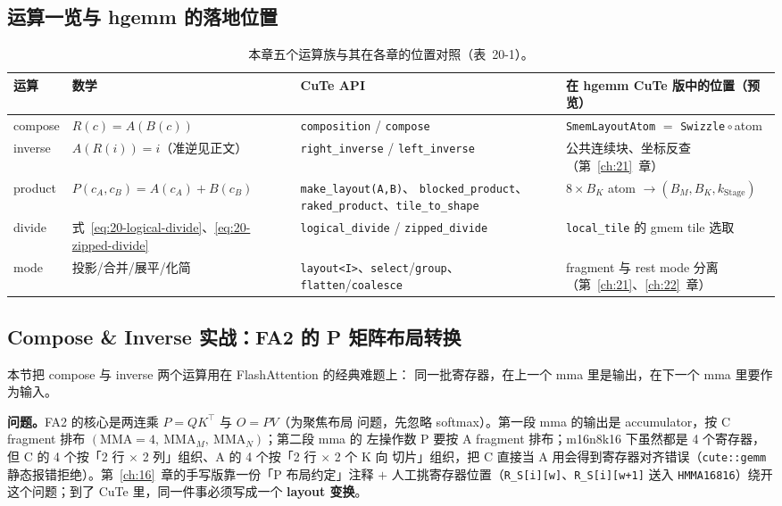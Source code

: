 \subsection{运算一览与 hgemm 的落地位置}

\begin{table}[htbp]
\centering
\footnotesize
\begin{tabular}{@{}p{1.3cm}p{3.2cm}p{3.7cm}p{4.3cm}@{}}
  \hline
  运算 & 数学 & CuTe API & 在 hgemm CuTe 版中的位置（预览） \\
  \hline
  compose & $R(c)=A(B(c))$ & \texttt{composition} / \texttt{compose}
    & \texttt{Smem\allowbreak{}Layout\allowbreak{}Atom} $=$ \texttt{Swizzle}\,$\circ$\,atom \\
  inverse & $A(R(i))=i$（准逆见正文） & \texttt{right\_\allowbreak{}inverse} / \texttt{left\_\allowbreak{}inverse}
    & 公共连续块、坐标反查（第~\ref{ch:21}~章） \\
  product & $P(c_A,c_B)=A(c_A)+B(c_B)$ & \texttt{make\_\allowbreak{}layout\allowbreak{}(A,\allowbreak{}B)}、
    \texttt{blocked\_\allowbreak{}product}、\texttt{raked\_\allowbreak{}product}、\texttt{tile\_\allowbreak{}to\_\allowbreak{}shape}
    & $8\times B_K$ atom $\to(B_M,B_K,k_{\mathrm{Stage}})$ \\
  divide & 式~\eqref{eq:20-logical-divide}、\eqref{eq:20-zipped-divide}
    & \texttt{logical\_\allowbreak{}divide} / \texttt{zipped\_\allowbreak{}divide}
    & \texttt{local\_tile} 的 gmem tile 选取 \\
  mode & 投影/合并/展平/化简 & \texttt{layout<I>}、\texttt{select}/\texttt{group}、
    \texttt{flatten}/\texttt{coalesce}
    & fragment 与 rest mode 分离（第~\ref{ch:21}、\ref{ch:22}~章） \\
  \hline
\end{tabular}
\caption{本章五个运算族与其在各章的位置对照（表~20-1）。}\label{tab:20-1}
\end{table}

\subsection{Compose \& Inverse 实战：FA2 的 P 矩阵布局转换}

本节把 compose 与 inverse 两个运算用在 FlashAttention 的经典难题上：
同一批寄存器，在上一个 mma 里是输出，在下一个 mma 里要作为输入。

\textbf{问题。}\allowbreak{}FA2 的核心是两连乘 $P=QK^{\top}$ 与 $O=PV$（为聚焦布局
问题，先忽略 softmax）。第一段 mma 的输出是 accumulator，按 C fragment
排布 $(\mathrm{MMA}=4,\ \mathrm{MMA}_M,\ \mathrm{MMA}_N)$；第二段 mma 的
左操作数 P 要按 A fragment 排布；m16n8k16 下虽然都是 4 个寄存器，但 C 的
4 个按「2 行 $\times$ 2 列」组织、A 的 4 个按「2 行 $\times$ 2 个 K 向
切片」组织，把 C 直接当 A 用会得到寄存器对齐错误（\texttt{cute::gemm}
静态报错拒绝）。第~\ref{ch:16}~章的手写版靠一份「P 布局约定」注释 $+$
人工挑寄存器位置（\texttt{R\_S[i][w]}、\texttt{R\_S[i][w+1]} 送入
\texttt{HMMA16816}）绕开这个问题；到了 CuTe 里，同一件事必须写成一个
\textbf{layout 变换}。

